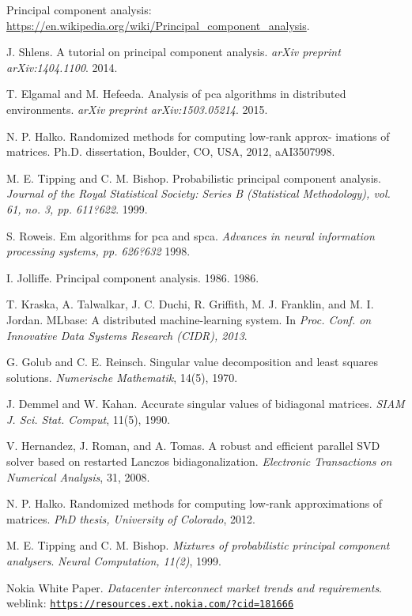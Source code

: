 \documentclass[10pt,conference,letterpaper]{IEEEtran}
\begin{document}
\begin{thebibliography}{1}
Principal component analysis: \url{https://en.wikipedia.org/wiki/Principal_component_analysis}.

J. Shlens. A tutorial on principal component analysis. \textit{arXiv preprint
arXiv:1404.1100}. 2014.

T. Elgamal and M. Hefeeda. Analysis of pca algorithms in distributed environments. \textit{arXiv preprint arXiv:1503.05214}. 2015.

N. P. Halko. Randomized methods for computing low-rank approx- imations of matrices. Ph.D. dissertation, Boulder, CO, USA, 2012, aAI3507998.

M. E. Tipping and C. M. Bishop. Probabilistic principal component analysis. \textit{Journal of the Royal Statistical Society: Series B (Statistical Methodology), vol. 61, no. 3, pp. 611?622}. 1999.

S. Roweis. Em algorithms for pca and spca. \textit{Advances in neural information processing systems, pp. 626?632} 1998.

I. Jolliffe. Principal component analysis. 1986. 1986.

T. Kraska, A. Talwalkar, J. C. Duchi, R. Griffith, M. J.
Franklin, and M. I. Jordan. MLbase: A distributed machine-learning system. In \textit{Proc. Conf. on Innovative Data Systems Research (CIDR), 2013}.

G. Golub and C. E. Reinsch. Singular value decomposition and least squares solutions. \textit{Numerische Mathematik}, 14(5), 1970.

J. Demmel and W. Kahan. Accurate singular values of bidiagonal matrices. \textit{SIAM J. Sci. Stat. Comput}, 11(5), 1990.

V. Hernandez, J. Roman, and A. Tomas. A robust and efficient parallel SVD solver based on restarted Lanczos bidiagonalization. \textit{Electronic Transactions on Numerical Analysis}, 31, 2008.

N. P. Halko. Randomized methods for computing low-rank approximations of matrices. \textit{PhD thesis, University of Colorado}, 2012.

M. E. Tipping and C. M. Bishop. \textit{Mixtures of probabilistic principal component analysers}. \textit{Neural Computation, 11(2)}, 1999.

Nokia White Paper. \textit{Datacenter interconnect market trends and requirements}.
weblink: \texttt{\url{https://resources.ext.nokia.com/?cid=181666}}


\end{thebibliography}
\end{document}
